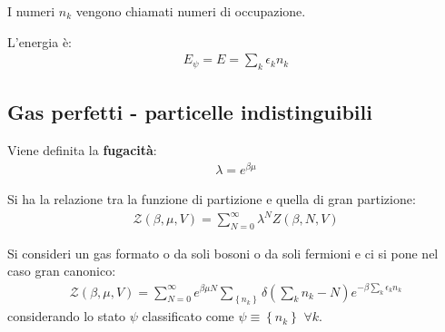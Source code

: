 I numeri $n_k$ vengono chiamati numeri di occupazione.

L'energia è:
\begin{equation}\begin{split}
E_\psi =E=\sum_k{\epsilon_kn_k}
\end{split}\end{equation}

\subsection{Gas perfetti - particelle indistinguibili} %
Viene definita la \textbf{fugacità}:
\begin{equation}\begin{split}
\lambda=e^{\beta \mu}
\end{split}\end{equation}

Si ha la relazione tra la funzione di partizione e quella di gran partizione:
\begin{equation}\begin{split}
\mathcal{Z}\left(\beta,\mu,V\right)=\sum_{N=0}^{\infty }{\lambda^NZ\left(\beta,N,V\right)}
\end{split}\end{equation}

Si consideri un gas formato o da soli bosoni o da soli fermioni e ci si pone nel caso gran canonico:
\begin{equation}\begin{split}
\mathcal{Z}\left(\beta,\mu,V\right)=\sum_{N=0}^{\infty }{e^{\beta\mu N}}\sum_{\left\{n_k\right\}}{\delta\left(\sum_k{n_k-N}\right)e^{-\beta \sum_k{\epsilon_kn_k}}}
\end{split}\end{equation}
considerando lo stato $\psi $ classificato come $\psi \equiv \left\{n_k\right\}$ $\forall k$.